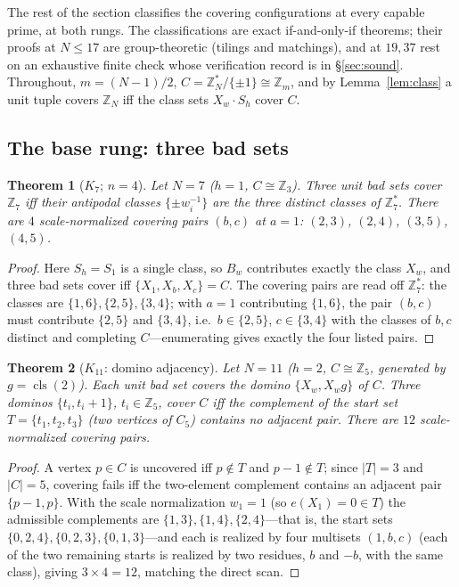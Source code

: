 \documentclass[11pt,a4paper]{article}
\numberwithin{equation}{section}
\theoremstyle{plain}
\newtheorem{theorem}{Theorem}[section]
\theoremstyle{definition}
\theoremstyle{remark}
\newcommand{\Z}{\mathbb{Z}}
\DeclareMathOperator{\cls}{cls}
\begin{document}
The rest of the section classifies the covering configurations at every
capable prime, at both rungs. The classifications are exact
if-and-only-if theorems; their proofs at $N\le 17$ are group-theoretic
(tilings and matchings), and at $19,37$ rest on an exhaustive finite check
whose verification record is in \S\ref{sec:sound}. Throughout,
$m=(N-1)/2$, $C=\Z_N^\ast/\{\pm1\}\cong\Z_m$, and by
Lemma~\ref{lem:class} a unit tuple covers $\Z_N$ iff the class sets
$X_w\cdot S_h$ cover $C$.

\subsection{The base rung: three bad sets}\label{sec:K4}

\begin{theorem}[$K_7$; $n=4$]\label{thm:K4}
Let $N=7$ ($h=1$, $C\cong\Z_3$). Three unit bad sets cover $\Z_7$ iff
their antipodal classes $\{\pm w_i^{-1}\}$ are the three distinct classes
of $\Z_7^\ast$. There are $4$ scale-normalized covering pairs
$(b,c)$ at $a=1$: $(2,3)$, $(2,4)$, $(3,5)$, $(4,5)$.
\end{theorem}

\begin{proof}
Here $S_h=S_1$ is a single class, so $B_w$ contributes exactly the class
$X_w$, and three bad sets cover iff $\{X_1,X_b,X_c\}=C$. The covering
pairs are read off $\Z_7^\ast$: the classes are
$\{1,6\},\{2,5\},\{3,4\}$; with $a=1$ contributing $\{1,6\}$, the pair
$(b,c)$ must contribute $\{2,5\}$ and $\{3,4\}$, i.e.\
$b\in\{2,5\}$, $c\in\{3,4\}$ with the classes of $b,c$ distinct and
completing $C$---enumerating gives exactly the four listed pairs.
\end{proof}

\begin{theorem}[$K_{11}$: domino adjacency]\label{thm:K11}
Let $N=11$ ($h=2$, $C\cong\Z_5$, generated by $g=\cls(2)$). Each unit
bad set covers the \emph{domino} $\{X_w,X_w g\}$ of $C$. Three dominos
$\{t_i,t_i+1\}$, $t_i\in\Z_5$, cover $C$ iff the complement of the start
set $T=\{t_1,t_2,t_3\}$ (two vertices of $C_5$) contains no adjacent
pair. There are $12$ scale-normalized covering pairs.
\end{theorem}

\begin{proof}
A vertex $p\in C$ is uncovered iff $p\notin T$ and $p-1\notin T$; since
$|T|=3$ and $|C|=5$, covering fails iff the two-element complement
contains an adjacent pair $\{p-1,p\}$. With the scale normalization
$w_1=1$ (so $e(X_1)=0\in T$) the admissible complements are
$\{1,3\},\{1,4\},\{2,4\}$---that is, the start sets
$\{0,2,4\},\{0,2,3\},\{0,1,3\}$---and each is realized by four
multisets $(1,b,c)$ (each of the two remaining starts is realized by two
residues, $b$ and $-b$, with the same class), giving $3\times 4=12$,
matching the direct scan.
\end{proof}
\end{document}
